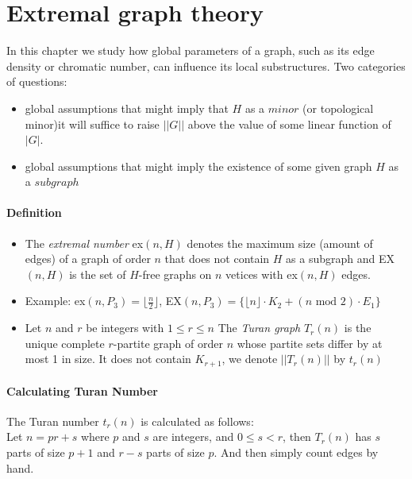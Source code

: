 \section{Extremal graph theory}
In this chapter we study how global parameters of a graph, such as its edge 
density or chromatic number, can influence its local substructures.
Two categories of questions:
\begin{itemize}
    \item global assumptions that might imply that $ H $ as a $minor$ 
    (or topological minor)it will suffice to raise $ ||G|| $ above the 
    value of some linear function of $|G|$.
    \item global assumptions that might imply the existence of some 
    given graph $ H $ as a $subgraph$ 
\end{itemize}

\paragraph{Definition} 
\begin{itemize}
    \item The \textit{extremal number} ex$(n,H)$ denotes the maximum
        size (amount of edges) of a graph of order $ n $ that does not contain
        $ H $ as a subgraph and EX$(n,H)$ is the set of $H$-free graphs on $n$
        vetices with ex$(n,H)$ edges.
    \item Example: ex$(n,P_3) = \lfloor\frac{n}{2}\rfloor$, EX$(n,P_3)
    = \{\lfloor n\rfloor \cdot K_2 + (n \text{ mod } 2) \cdot E_1\} $
    \item Let $ n $ and $ r $ be integers with $ 1 \leq r \leq n $ The 
    \textit{Turan graph} $T_r(n)$ is the unique complete $r$-partite graph of 
    order $n$ whose partite sets differ by at most 1 in size. 
    It does not contain $K_{r+1}$, we denote $||T_r(n)||$ by $t_r(n)$
\end{itemize}

\paragraph{Calculating Turan Number} $ $\\
The Turan number $t_r(n)$ is calculated as follows:\\
Let $n = pr + s$ where $ p $ and $ s $ are integers, and 
$ 0 \leq s < r $, then $ T_r(n) $ has $ s $ parts of size $p + 1$
and $r - s$ parts of size $ p$. And then simply count edges by hand.

